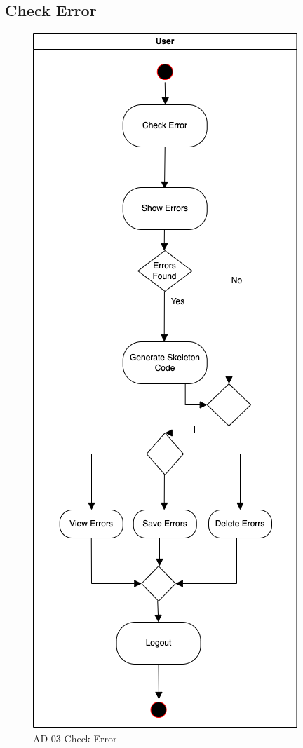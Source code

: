 \documentclass[12pt,a4paper]{article}
\begin{document}
\subsection{Check Error}
\begin{figure}[hb]
 \centering
\includegraphics[scale=0.50]{Diagram/Checking_Error.drawio.png}
\caption{AD-03 Check Error}
\end{figure}
\end{document}
